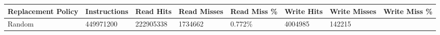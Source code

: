 \documentclass[11pt]{article}
\begin{document}
\begin{longtable}[]{@{}llllllll@{}}
\toprule
\begin{minipage}[b]{0.14\columnwidth}\raggedright\strut
Replacement Policy\strut
\end{minipage} & \begin{minipage}[b]{0.10\columnwidth}\raggedright\strut
Instructions\strut
\end{minipage} & \begin{minipage}[b]{0.08\columnwidth}\raggedright\strut
Read Hits\strut
\end{minipage} & \begin{minipage}[b]{0.09\columnwidth}\raggedright\strut
Read Misses\strut
\end{minipage} & \begin{minipage}[b]{0.09\columnwidth}\raggedright\strut
Read Miss \%\strut
\end{minipage} & \begin{minipage}[b]{0.09\columnwidth}\raggedright\strut
Write Hits\strut
\end{minipage} & \begin{minipage}[b]{0.10\columnwidth}\raggedright\strut
Write Misses\strut
\end{minipage} & \begin{minipage}[b]{0.10\columnwidth}\raggedright\strut
Write Miss \%\strut
\end{minipage}\tabularnewline
\midrule
\endhead
\begin{minipage}[t]{0.14\columnwidth}\raggedright\strut
Random\strut
\end{minipage} & \begin{minipage}[t]{0.10\columnwidth}\raggedright\strut
449971200\strut
\end{minipage} & \begin{minipage}[t]{0.08\columnwidth}\raggedright\strut
222905338\strut
\end{minipage} & \begin{minipage}[t]{0.09\columnwidth}\raggedright\strut
1734662\strut
\end{minipage} & \begin{minipage}[t]{0.09\columnwidth}\raggedright\strut
0.772\%\strut
\end{minipage} & \begin{minipage}[t]{0.09\columnwidth}\raggedright\strut
4004985\strut
\end{minipage} & \begin{minipage}[t]{0.10\columnwidth}\raggedright\strut
142215\strut

\end{minipage}
\end{longtable}
\end{document}
